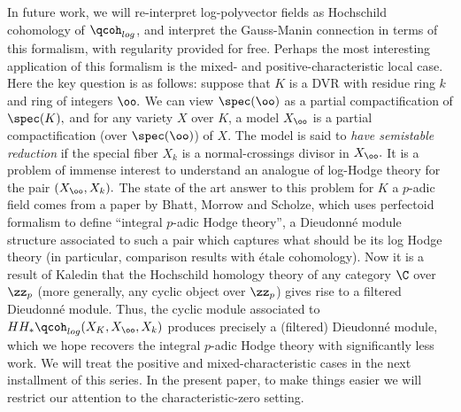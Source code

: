 \documentclass{article}
\begin{document}
In future work, we will re-interpret log-polyvector fields as Hochschild cohomology of $\qcoh_{log}$, and interpret the Gauss-Manin connection in terms of this formalism, with regularity provided for free. Perhaps the most interesting application of this formalism is the mixed- and positive-characteristic local case. Here the key question is as follows: suppose that $K$ is a DVR with residue ring $k$ and ring of integers $\oo.$ We can view $\spec(\oo)$ as a partial compactification of $\spec(K),$ and for any variety $X$ over $K$, a model $X_\oo$ is a partial compactification (over $\spec(\oo)$) of $X$. The model is said to \emph{have semistable reduction} if the special fiber $X_k$ is a normal-crossings divisor in $X_\oo.$ It is a problem of immense interest to understand an analogue of log-Hodge theory for the pair $(X_\oo, X_k).$ The state of the art answer to this problem for $K$ a $p$-adic field comes from a paper by Bhatt, Morrow and Scholze, which uses perfectoid formalism to define ``integral $p$-adic Hodge theory'', a Dieudonn\'e module structure associated to such a pair which captures what should be its log Hodge theory (in particular, comparison results with \'etale cohomology). Now it is a result of Kaledin \cite{kaledin1} that the Hochschild homology theory of any category $\C$ over $\zz_p$ (more generally, any cyclic object over $\zz_p$) gives rise to a filtered Dieudonn\'e module. Thus, the cyclic module associated to $HH_*\qcoh_{log}(X_K, X_\oo, X_k)$ produces precisely a (filtered) Dieudonn\'e module, which we hope recovers the integral $p$-adic Hodge theory with significantly less work. We will treat the positive and mixed-characteristic cases in the next installment of this series. In the present paper, to make things easier we will restrict our attention to the characteristic-zero setting.
\end{document}
